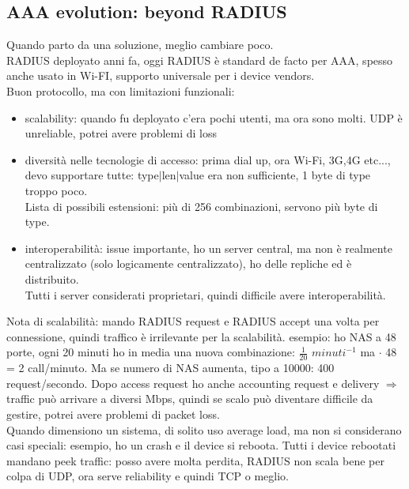 \documentclass[16px]{article}
\begin{document}
\subsection{AAA evolution: beyond RADIUS}
Quando parto da una soluzione, meglio cambiare poco.\\ RADIUS deployato anni fa, oggi RADIUS è standard de facto per AAA, spesso anche usato in Wi-FI, supporto universale per i device vendors.\\ Buon protocollo, ma con limitazioni funzionali:
\begin{itemize}
\item scalability: quando fu deployato c'era pochi utenti, ma ora sono molti. UDP è unreliable, potrei avere problemi di loss
\item diversità nelle tecnologie di accesso: prima dial up, ora Wi-Fi, 3G,4G etc..., devo supportare tutte: type$|$len$|$value era non sufficiente, 1 byte di type troppo poco.\\ Lista di possibili estensioni: più di 256 combinazioni, servono più byte di type.
\item interoperabilità: issue importante, ho un server central, ma non è realmente centralizzato (solo logicamente centralizzato), ho delle repliche ed è distribuito.\\ Tutti i server considerati proprietari, quindi difficile avere interoperabilità.
\end{itemize}
Nota di scalabilità: mando RADIUS request e RADIUS accept una volta per connessione, quindi traffico è irrilevante per la scalabilità. esempio: ho NAS a 48 porte, ogni 20 minuti ho in media una nuova combinazione: $\frac{1}{20}$ $minuti^{-1}$ ma $\cdot$ 48 = 2 call/minuto. Ma se numero di NAS aumenta, tipo a 10000: 400 request/secondo. Dopo access request ho anche accounting request e delivery $\Rightarrow$ traffic può arrivare a diversi Mbps, quindi se scalo può diventare difficile da gestire, potrei avere problemi di packet loss.\\ Quando dimensiono un sistema, di solito uso average load, ma non si considerano casi speciali: esempio, ho un crash e il device si reboota. Tutti i device rebootati mandano peek traffic: posso avere molta perdita, RADIUS non scala bene per colpa di UDP, ora serve reliability e quindi TCP o meglio.
\end{document}
